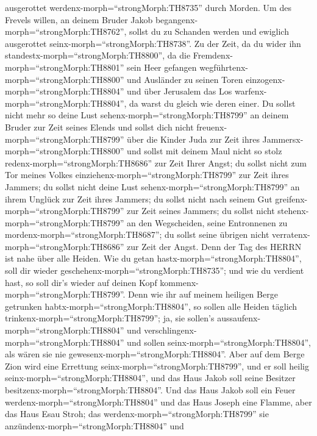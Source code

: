 ausgerottet werdenx-morph=``strongMorph:TH8735'' durch Morden.
 Um des Frevels willen, an deinem Bruder Jakob
begangenx-morph=``strongMorph:TH8762'', sollst du zu Schanden werden und
ewiglich ausgerottet seinx-morph=``strongMorph:TH8738''. 
Zu der Zeit, da du wider ihn standestx-morph=``strongMorph:TH8800'', da
die Fremdenx-morph=``strongMorph:TH8801'' sein Heer gefangen
wegführtenx-morph=``strongMorph:TH8800'' und Ausländer zu seinen Toren
einzogenx-morph=``strongMorph:TH8804'' und über Jerusalem das Los
warfenx-morph=``strongMorph:TH8804'', da warst du gleich wie deren
einer.  Du sollst nicht mehr so deine Lust
sehenx-morph=``strongMorph:TH8799'' an deinem Bruder zur Zeit seines
Elends und sollst dich nicht freuenx-morph=``strongMorph:TH8799'' über
die Kinder Juda zur Zeit ihres Jammersx-morph=``strongMorph:TH8800'' und
sollst mit deinem Maul nicht so stolz
redenx-morph=``strongMorph:TH8686'' zur Zeit Ihrer Angst; 
du sollst nicht zum Tor meines Volkes
einziehenx-morph=``strongMorph:TH8799'' zur Zeit ihres Jammers; du
sollst nicht deine Lust sehenx-morph=``strongMorph:TH8799'' an ihrem
Unglück zur Zeit ihres Jammers; du sollst nicht nach seinem Gut
greifenx-morph=``strongMorph:TH8799'' zur Zeit seines Jammers;
 du sollst nicht stehenx-morph=``strongMorph:TH8799'' an
den Wegscheiden, seine Entronnenen zu
mordenx-morph=``strongMorph:TH8687''; du sollst seine übrigen nicht
verratenx-morph=``strongMorph:TH8686'' zur Zeit der Angst. 
Denn der Tag des HERRN ist nahe über alle Heiden. Wie du getan
hastx-morph=``strongMorph:TH8804'', soll dir wieder
geschehenx-morph=``strongMorph:TH8735''; und wie du verdient hast, so
soll dir's wieder auf deinen Kopf kommenx-morph=``strongMorph:TH8799''.
 Denn wie ihr auf meinem heiligen Berge getrunken
habtx-morph=``strongMorph:TH8804'', so sollen alle Heiden täglich
trinkenx-morph=``strongMorph:TH8799''; ja, sie sollen's
aussaufenx-morph=``strongMorph:TH8804'' und
verschlingenx-morph=``strongMorph:TH8804'' und sollen
seinx-morph=``strongMorph:TH8804'', als wären sie nie
gewesenx-morph=``strongMorph:TH8804''.  Aber auf dem Berge
Zion wird eine Errettung seinx-morph=``strongMorph:TH8799'', und er soll
heilig seinx-morph=``strongMorph:TH8804'', und das Haus Jakob soll seine
Besitzer besitzenx-morph=``strongMorph:TH8804''.  Und das
Haus Jakob soll ein Feuer werdenx-morph=``strongMorph:TH8804'' und das
Haus Joseph eine Flamme, aber das Haus Esau Stroh; das
werdenx-morph=``strongMorph:TH8799'' sie
anzündenx-morph=``strongMorph:TH8804'' und

